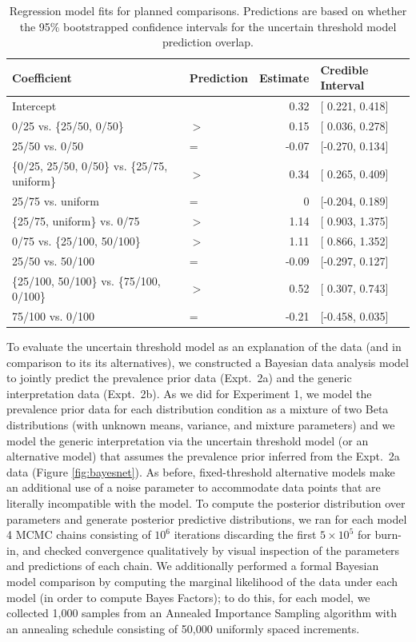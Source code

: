 \documentclass[floatsintext,doc]{apa6}
\begin{document}
\begin{table}[h]
\centering
\begingroup\fontsize{10pt}{11pt}\selectfont
\begin{tabular}{llrl}
  \hline
Coefficient & Prediction & Estimate & Credible Interval \\ 
  \hline
Intercept &  & 0.32 & [ 0.221, 0.418] \\ 
  0/25 vs. \{25/50, 0/50\} & $>$ & 0.15 & [ 0.036, 0.278] \\ 
  25/50 vs. 0/50 & = & -0.07 & [-0.270, 0.134] \\ 
  \{0/25, 25/50, 0/50\} vs. \{25/75, uniform\} & $>$ & 0.34 & [ 0.265, 0.409] \\ 
  25/75 vs. uniform & = & 0 & [-0.204, 0.189] \\ 
  \{25/75, uniform\} vs. 0/75 & $>$ & 1.14 & [ 0.903, 1.375] \\ 
  0/75 vs. \{25/100, 50/100\} & $>$ & 1.11 & [ 0.866, 1.352] \\ 
  25/50 vs. 50/100 & = & -0.09 & [-0.297, 0.127] \\ 
  \{25/100, 50/100\} vs. \{75/100, 0/100\} & $>$ & 0.52 & [ 0.307, 0.743] \\ 
  75/100 vs. 0/100 & = & -0.21 & [-0.458, 0.035] \\ 
   \hline
\end{tabular}
\endgroup
\caption{Regression model fits for planned comparisons. Predictions are based on whether the 95\% bootstrapped confidence intervals for the uncertain threshold model prediction overlap.} 
\label{tab:regResults}
\end{table}

To evaluate the uncertain threshold model as an explanation of the data (and in comparison to its its alternatives), we constructed a Bayesian data analysis model to jointly predict the prevalence prior data (Expt.~2a) and the generic interpretation data (Expt.~2b).
As we did for Experiment 1, we model the prevalence prior data for each distribution condition as a mixture of two Beta distributions (with unknown means, variance, and mixture parameters) and we model the generic interpretation via the uncertain threshold model (or an alternative model) that assumes the prevalence prior inferred from the Expt.~2a data (Figure \ref{fig:bayesnet}).
As before, fixed-threshold alternative models make an additional use of a noise parameter to accommodate data points that are literally incompatible with the model. 
To compute the posterior distribution over parameters and generate posterior predictive distributions, we ran for each model 4 MCMC chains consisting of $10^6$ iterations discarding the first $5 \times 10^5$ for burn-in, and checked convergence qualitatively by visual inspection of the parameters and predictions of each chain. 
We additionally performed a formal Bayesian model comparison by computing the marginal likelihood of the data under each model (in order to compute Bayes Factors); to do this, for each model, we collected 1,000 samples from an Annealed Importance Sampling algorithm with an annealing schedule consisting of 50,000 uniformly spaced increments. 
\end{document}
